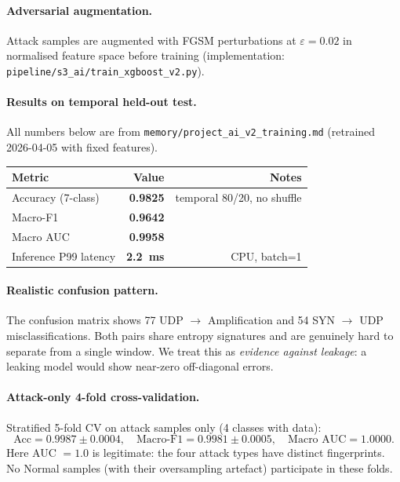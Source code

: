 \paragraph{Adversarial augmentation.}
Attack samples are augmented with FGSM perturbations at
$\varepsilon = 0.02$ in normalised feature space before training
(implementation: \texttt{pipeline/s3\_ai/train\_xgboost\_v2.py}).

\paragraph{Results on temporal held-out test.}
All numbers below are from \texttt{memory/project\_ai\_v2\_training.md}
(retrained 2026-04-05 with fixed features).

\begin{center}
\small
\begin{tabular}{@{}lrr@{}}
\toprule
Metric & Value & Notes \\
\midrule
Accuracy (7-class)     & \textbf{0.9825} & temporal 80/20, no shuffle \\
Macro-F1               & \textbf{0.9642} & \\
Macro AUC              & \textbf{0.9958} & \\
Inference P99 latency  & \textbf{2.2~ms} & CPU, batch=1 \\
\bottomrule
\end{tabular}
\end{center}

\paragraph{Realistic confusion pattern.}
The confusion matrix shows 77 UDP $\to$ Amplification and 54 SYN
$\to$ UDP misclassifications. Both pairs share entropy signatures and
are genuinely hard to separate from a single window. We treat this as
\emph{evidence against leakage}: a leaking model would show near-zero
off-diagonal errors.

\paragraph{Attack-only 4-fold cross-validation.}
Stratified 5-fold CV on attack samples only (4 classes with data):
\[
  \text{Acc} = 0.9987 \pm 0.0004,\quad
  \text{Macro-F1} = 0.9981 \pm 0.0005,\quad
  \text{Macro AUC} = 1.0000.
\]
Here AUC $= 1.0$ is legitimate: the four attack types have distinct
fingerprints. No Normal samples (with their oversampling artefact)
participate in these folds.

